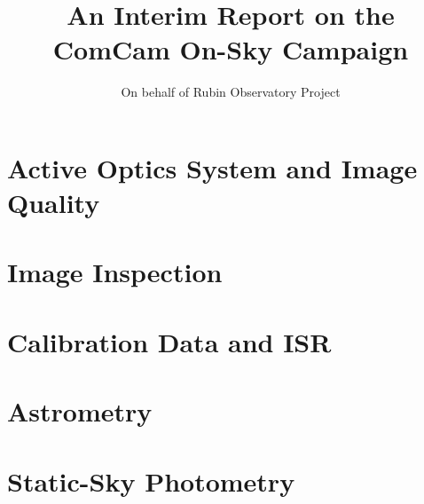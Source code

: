 \documentclass[SE,lsstdraft,authoryear,toc]{lsstdoc}
\title{An Interim Report on the ComCam On-Sky Campaign}
\author{%
On behalf of Rubin Observatory Project
}
\date{\vcsDate}
\begin{document}
\maketitle








\section{Active Optics System and Image Quality}






\section{Image Inspection}
\label{sec:image_inspection}



\section{Calibration Data and ISR}




\section{Astrometry}



\section{Static-Sky Photometry}








\end{document}
